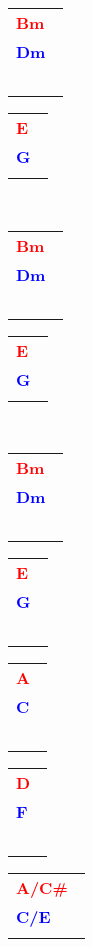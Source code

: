 \documentclass[12pt,a4paper,openany,UTF8]{memoir}
\begin{document}
   \begin{tabular}[b]{l}
    \textbf{\textcolor{red}{Bm\ }}\\\textbf{\textcolor{blue}{Dm\ }}\\
    ~\mbox{}\end{tabular}\begin{tabular}[b]{l}
    \textbf{\textcolor{red}{E\ }}\\\textbf{\textcolor{blue}{G\ }}\\
    \mbox{}\end{tabular}\\
\begin{tabular}[b]{l}
    \textbf{\textcolor{red}{Bm\ }}\\\textbf{\textcolor{blue}{Dm\ }}\\
    ~\mbox{}\end{tabular}\begin{tabular}[b]{l}
    \textbf{\textcolor{red}{E\ }}\\\textbf{\textcolor{blue}{G\ }}\\
    \mbox{}\end{tabular}\\
\begin{tabular}[b]{l}
    \textbf{\textcolor{red}{Bm\ }}\\\textbf{\textcolor{blue}{Dm\ }}\\
    ~\mbox{}\end{tabular}\begin{tabular}[b]{l}
    \textbf{\textcolor{red}{E\ }}\\\textbf{\textcolor{blue}{G\ }}\\
    ~\mbox{}\end{tabular}\begin{tabular}[b]{l}
    \textbf{\textcolor{red}{A\ }}\\\textbf{\textcolor{blue}{C\ }}\\
    ~\mbox{}\end{tabular}\begin{tabular}[b]{l}
    \textbf{\textcolor{red}{D\ }}\\\textbf{\textcolor{blue}{F\ }}\\
    ~\mbox{}\end{tabular}\begin{tabular}[b]{l}
    \textbf{\textcolor{red}{A/C\#\ }}\\\textbf{\textcolor{blue}{C/E\ }}\\
    \mbox{}\end{tabular}\\
\end{document}
